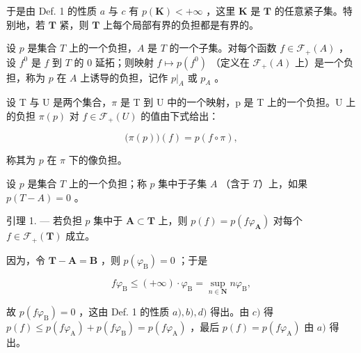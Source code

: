 于是由 Def. 1 的性质 \(a\) 与 \(c\) 有 \(p(\mathbf{K}) < +\infty\) ，这里 \(\mathbf{K}\) 是 \(\mathbf{T}\) 的任意紧子集。特别地，若 \(\mathbf{T}\) 紧，则 \(\mathbf{T}\) 上每个局部有界的负担都是有界的。

设 \(p\) 是集合 \(T\) 上的一个负担，\(A\) 是 \(T\) 的一个子集。对每个函数 \(f \in \mathcal{F}_{+}(A)\) ，设 \(f^0\) 是 \(f\) 到 \(T\) 的 0 延拓；则映射 \(f \mapsto p(f^0)\) （定义在 \(\mathcal{F}_{+}(A)\) 上）是一个负担，称为 \(p\) 在 \(A\) 上诱导的负担，记作 \(p|_{A}\) 或 \(p_A\) 。

设 T 与 U 是两个集合，\(\pi\) 是 T 到 U 中的一个映射，p 是 T 上的一个负担。U 上的负担 \(\pi(p)\) 对 \(f \in \mathcal{F}_{+}(U)\) 的值由下式给出：

\[
\bigl (\pi (p) \bigr) (f) = p (f \circ \pi),
\]

称其为 \(p\) 在 \(\pi\) 下的像负担。

设 \(p\) 是集合 \(T\) 上的一个负担；称 \(p\) 集中于子集 \(A\) （含于 \(T\)）上，如果 \(p(T - A) = 0\) 。

引理 1. --- 若负担 \(p\) 集中于 \(\mathbf{A} \subset \mathbf{T}\) 上，则 \(p(f) = p(f\varphi_{\mathbf{A}})\) 对每个 \(f \in \mathcal{F}_{+}(\mathbf{T})\) 成立。

因为，令 \(\mathbf{T} - \mathbf{A} = \mathbf{B}\) ，则 \(p(\varphi_{\mathrm{B}}) = 0\) ；于是

\[
f \varphi_ {\mathrm{B}} \leqslant (+ \infty) \cdot \varphi_ {\mathrm{B}} = \sup _ {n \in \mathbf {N}} n \varphi_ {\mathrm{B}},
\]

故 \(p(f\varphi_{\mathrm{B}}) = 0\) ，这由 Def. 1 的性质 \(a), b), d)\) 得出。由 \(c)\) 得 \(p(f) \leqslant p(f\varphi_{\mathrm{A}}) + p(f\varphi_{\mathrm{B}}) = p(f\varphi_{\mathrm{A}})\) ，最后 \(p(f) = p(f\varphi_{\mathrm{A}})\) 由 \(a)\) 得出。

